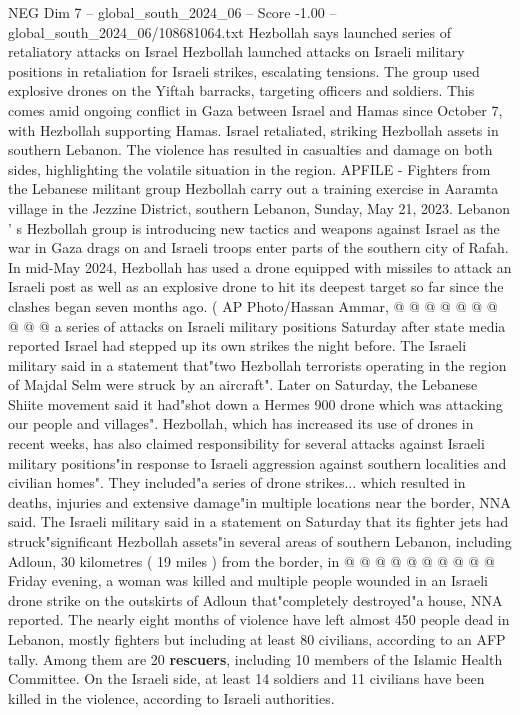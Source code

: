 \begin{textsample}{NEG Dim 7 – global\_south\_2024\_06 – Score -1.00 – global\_south\_2024\_06/108681064.txt}  \label{ex:f7_neg_216}
Hezbollah says launched series of retaliatory attacks on Israel Hezbollah launched attacks on Israeli military positions in retaliation for Israeli strikes, escalating tensions.
The group used explosive drones on the Yiftah barracks, targeting officers and soldiers.
This comes amid ongoing conflict in Gaza between Israel and Hamas since October 7, with Hezbollah supporting Hamas.
Israel retaliated, striking Hezbollah assets in southern Lebanon.
The violence has resulted in casualties and damage on both sides, highlighting the volatile situation in the region.
APFILE - Fighters from the Lebanese militant group Hezbollah carry out a training exercise in Aaramta village in the Jezzine District, southern Lebanon, Sunday, May 21, 2023.
Lebanon ' s Hezbollah group is introducing new tactics and weapons against Israel as the war in Gaza drags on and Israeli troops enter parts of the southern city of Rafah.
In mid-May 2024, Hezbollah has used a drone equipped with missiles to attack an Israeli post as well as an explosive drone to hit its deepest target so far since the clashes began seven months ago. ( AP Photo/Hassan Ammar, @ @ @ @ @ @ @ @ @ @ a series of attacks on Israeli military positions Saturday after state media reported Israel had stepped up its own strikes the night before.
The Israeli military said in a statement that"two Hezbollah terrorists operating in the region of Majdal Selm were struck by an aircraft".
Later on Saturday, the Lebanese Shiite movement said it had"shot down a Hermes 900 drone which was attacking our people and villages".
Hezbollah, which has increased its use of drones in recent weeks, has also claimed responsibility for several attacks against Israeli military positions"in response to Israeli aggression against southern localities and civilian homes".
They included"a series of drone strikes... which resulted in deaths, injuries and extensive damage"in multiple locations near the border, NNA said.
The Israeli military said in a statement on Saturday that its fighter jets had struck"significant Hezbollah assets"in several areas of southern Lebanon, including Adloun, 30 kilometres ( 19 miles ) from the border, in @ @ @ @ @ @ @ @ @ @ Friday evening, a woman was killed and multiple people wounded in an Israeli drone strike on the outskirts of Adloun that"completely destroyed"a house, NNA reported.
The nearly eight months of violence have left almost 450 people dead in Lebanon, mostly fighters but including at least 80 civilians, according to an AFP tally.
Among them are 20 \textbf{rescuers}, including 10 members of the Islamic Health Committee.
On the Israeli side, at least 14 soldiers and 11 civilians have been killed in the violence, according to Israeli authorities.

\end{textsample}
